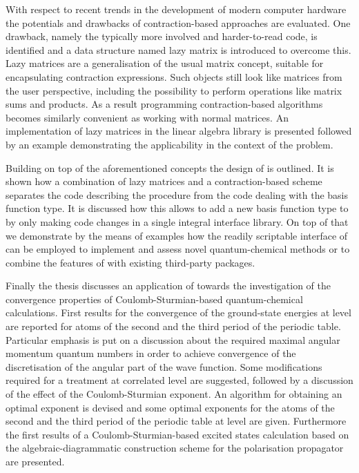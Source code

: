With respect to recent trends in the development of modern computer hardware
the potentials and drawbacks of contraction-based approaches are evaluated.
One drawback, namely the typically more involved and harder-to-read code,
is identified and a data structure named lazy matrix is introduced
to overcome this.
Lazy matrices are a generalisation of the usual matrix concept,
suitable for encapsulating contraction expressions.
Such objects still look like matrices from the user perspective,
including the possibility to perform operations like matrix sums and products.
As a result programming contraction-based algorithms
becomes similarly convenient as working with normal matrices.
An implementation of lazy matrices in the \lazyten linear algebra library
is presented followed by an example
demonstrating the applicability in the context of the \HF problem.

Building on top of the aforementioned concepts the design of \molsturm is outlined.
It is shown how a combination of lazy matrices and a contraction-based \SCF scheme
separates the code describing the \SCF procedure
from the code dealing with the basis function type.
It is discussed how this allows to add a new basis function type
to \molsturm by only making code changes in a single integral interface library.
On top of that we demonstrate by the means of examples
how the readily scriptable interface of \molsturm
can be employed to implement and assess novel quantum-chemical methods
or to combine the features of \molsturm with existing third-party packages.

Finally the thesis discusses an application of \molsturm
towards the investigation of the convergence properties
of Coulomb-Sturmian-based quantum-chemical calculations.
First results for the convergence
of the ground-state energies at \HF level
are reported for atoms of the second and the third period
of the periodic table.
Particular emphasis is put on a discussion about the required
maximal angular momentum quantum numbers
in order to achieve convergence
of the discretisation of the angular part of the wave function.
Some modifications required for a treatment at correlated level are suggested,
followed by a discussion of the effect of the Coulomb-Sturmian exponent.
An algorithm for obtaining an optimal exponent is devised
and some optimal exponents for the atoms of the
second and the third period of the periodic table at \HF level are given.
Furthermore the first results of a Coulomb-Sturmian-based excited
states calculation based on the algebraic-diagrammatic construction
scheme for the polarisation propagator are presented.


